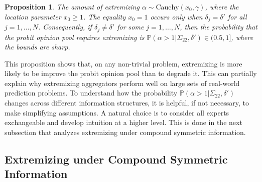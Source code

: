 \documentclass[11pt]{article}
\renewcommand{\P}{\mathbb{P}}
\newtheorem{proposition}[theorem]{Proposition}
\theoremstyle{definition}
\theoremstyle{definition}
\begin{document}
\begin{proposition}
\label{positiveProbThm}
The amount of extremizing $\alpha \sim \text{Cauchy}(x_0, \gamma)$, where the location parameter $x_0 \geq 1$. The equality $x_0 = 1$ occurs only when $\delta_j = \delta'$ for all $j = 1, \dots, N$. Consequently, if $\delta_j \neq \delta'$ for some $j = 1, \dots, N$, then the probability that the probit opinion pool requires extremizing is $\P(\alpha > 1 | \Sigma_{22}, \delta') \in (0.5,1]$, where the bounds are sharp.
\end{proposition}
\noindent
This proposition shows that, on any non-trivial problem, extremizing is more likely to be improve the probit opinion pool than to degrade it. This can partially explain why extremizing aggregators perform well on large sets of real-world prediction problems.  To understand how the probability $\P(\alpha > 1 | \Sigma_{22}, \delta')$  changes across different information structures,  
 it is helpful, if not necessary, to make simplifying assumptions. A natural choice is to consider all experts exchangeable and develop intuition at a higher level. This is done in the next subsection that analyzes extremizing under compound symmetric information. 




\subsection{Extremizing under Compound Symmetric Information}
\label{compound}
\end{document}
